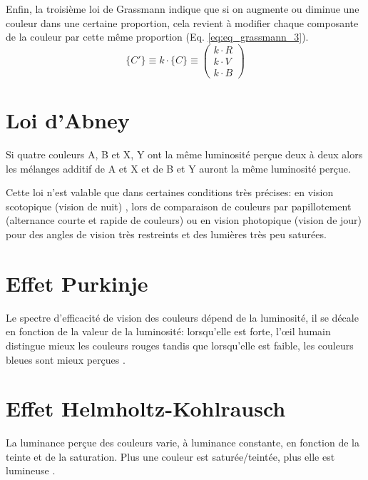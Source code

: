 		\par Enfin, la troisième loi de Grassmann indique que si on augmente ou diminue une couleur dans une certaine proportion, cela revient à modifier chaque composante de la couleur par cette même proportion (Eq. \ref{eq:eq_grassmann_3}).
		\begin{equation}
			\{C'\} \equiv k \cdot \{C\} \equiv \left( \begin{array}{ccc} k \cdot R \\ k \cdot V \\ k \cdot B \end{array} \right)
			\label{eq:eq_grassmann_3}
		\end{equation}
		
		\section*{Loi d'Abney}
		\par Si quatre couleurs A, B et X, Y ont la même luminosité perçue deux à deux alors les mélanges additif de A et X et de B et Y auront la même luminosité perçue.		
		
		\par Cette loi n'est valable que dans certaines conditions très précises: en vision scotopique (vision de nuit) \citep{le_grand_optique_1972}, lors de comparaison de couleurs par papillotement (alternance courte et rapide de couleurs) \citep{seve_science_2009} ou en vision photopique (vision de jour) pour des angles de vision très restreints et des lumières très peu saturées.
		
		\section*{Effet Purkinje}
		\par Le spectre d'efficacité de vision des couleurs dépend de la luminosité, il se décale en fonction de la valeur de la luminosité: lorsqu'elle est forte, l'œil humain distingue mieux les couleurs rouges tandis que lorsqu'elle est faible, les couleurs bleues sont mieux perçues \citep{le_grand_optique_1972}.
		
		\section*{Effet Helmholtz-Kohlrausch}
		\par La luminance perçue des couleurs varie, à luminance constante, en fonction de la teinte et de la saturation. Plus une couleur est saturée/teintée, plus elle est lumineuse \citep{le_grand_optique_1972}.
		
